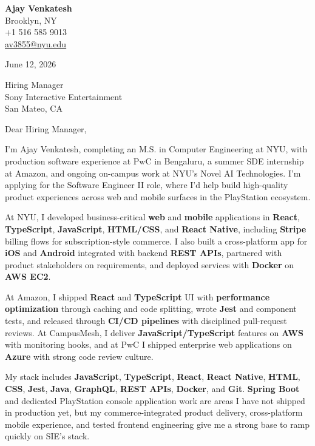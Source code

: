 \documentclass[letterpaper,11pt]{article}
\begin{document}
\begin{flushleft}
\textbf{\large Ajay Venkatesh} \\
Brooklyn, NY \\
+1 516 585 9013 \\
\href{mailto:av3855@nyu.edu}{av3855@nyu.edu}
\end{flushleft}
\vspace{10pt}
June 12, 2026
\vspace{6pt}

Hiring Manager \\
Sony Interactive Entertainment \\
San Mateo, CA

\vspace{10pt}

Dear Hiring Manager,

I'm Ajay Venkatesh, completing an M.S. in Computer Engineering at NYU, with production software experience at PwC in Bengaluru, a summer SDE internship at Amazon, and ongoing on-campus work at NYU's Novel AI Technologies. I'm applying for the Software Engineer II role, where I'd help build high-quality product experiences across web and mobile surfaces in the PlayStation ecosystem.

At NYU, I developed business-critical \textbf{web} and \textbf{mobile} applications in \textbf{React}, \textbf{TypeScript}, \textbf{JavaScript}, \textbf{HTML/CSS}, and \textbf{React Native}, including \textbf{Stripe} billing flows for subscription-style commerce. I also built a cross-platform app for \textbf{iOS} and \textbf{Android} integrated with backend \textbf{REST APIs}, partnered with product stakeholders on requirements, and deployed services with \textbf{Docker} on \textbf{AWS EC2}.

At Amazon, I shipped \textbf{React} and \textbf{TypeScript} UI with \textbf{performance optimization} through caching and code splitting, wrote \textbf{Jest} and component tests, and released through \textbf{CI/CD pipelines} with disciplined pull-request reviews. At CampusMesh, I deliver \textbf{JavaScript/TypeScript} features on \textbf{AWS} with monitoring hooks, and at PwC I shipped enterprise web applications on \textbf{Azure} with strong code review culture.

My stack includes \textbf{JavaScript}, \textbf{TypeScript}, \textbf{React}, \textbf{React Native}, \textbf{HTML}, \textbf{CSS}, \textbf{Jest}, \textbf{Java}, \textbf{GraphQL}, \textbf{REST APIs}, \textbf{Docker}, and \textbf{Git}. \textbf{Spring Boot} and dedicated PlayStation console application work are areas I have not shipped in production yet, but my commerce-integrated product delivery, cross-platform mobile experience, and tested frontend engineering give me a strong base to ramp quickly on SIE's stack.
\end{document}
